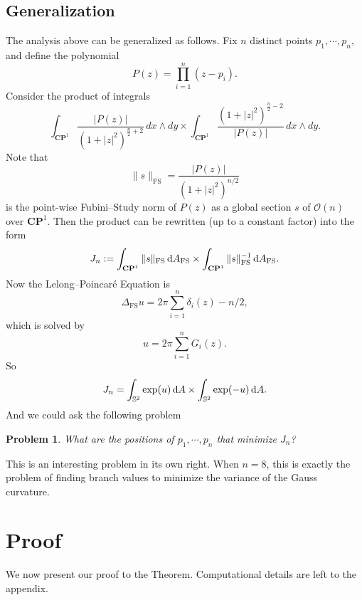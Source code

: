 \documentclass[a4paper]{amsart}
\newcommand{\CP}{\mathbf{CP}}
\newcommand{\cO}{\mathcal{O}}
\newcommand{\FS}{\text{FS}}
\newcommand{\uS}{\mathbb{S}}
\newcommand{\laplace}{\Delta}
\newcommand{\dd}{{\rm d}}
\theoremstyle{plain} %
\newtheorem*{problem}{Problem}
\theoremstyle{definition} %
\theoremstyle{remark}
\begin{document}
\subsection{Generalization}
\label{sec:npoints}

The analysis above can be generalized as follows.  Fix $n$ distinct points
$p_1, \cdots, p_n$, and define the polynomial
\[
	P(z) = \prod_{i=1}^n (z-p_i).
\]
Consider the product of integrals
\[
	\int_{\CP^1} \frac{|P(z)|}{(1+|z|^2)^{\frac{n}{2}+2}} \, dx \wedge dy \times
	\int_{\CP^1} \frac{(1+|z|^2)^{\frac{n}{2}-2}}{|P(z)|} \, dx \wedge dy.
\]
Note that
\[
	\|s\|_\FS = \frac{|P(z)|}{(1+|z|^2)^{n/2}}
\]
is the point-wise Fubini--Study norm of $P(z)$ as a global section $s$ of
$\cO(n)$ over $\CP^1$. Then the product can be rewritten (up to a constant
factor) into the form
\[
	J_n :=
	\int_{\CP^1} \| s \|_\FS \, \dd A_\FS \times
	\int_{\CP^1} \| s \|_\FS^{-1} \, \dd A_\FS. 
\]
Now the Lelong--Poincar\'e Equation is
\[
	\laplace_\FS u = 2\pi \sum_{i=1}^n \delta_i(z) - n/2,
\]
which is solved by
\[
	u = 2\pi \sum_{i=1}^n G_i(z).
\]
So
\[
	J_n = 
	\int_{\uS^2} \exp(u) \, \dd A \times
	\int_{\uS^2} \exp(-u) \, \dd A.
\]
And we could ask the following problem
\begin{problem}
	What are the positions of $p_1, \cdots, p_n$ that minimize $J_n$?
\end{problem}
This is an interesting problem in its own right.  When $n = 8$, this is exactly
the problem of finding branch values to minimize the variance of the Gauss
curvature.

\section{Proof}
\label{sec:proof}

We now present our proof to the Theorem.  Computational details are left to the
appendix.
\end{document}
